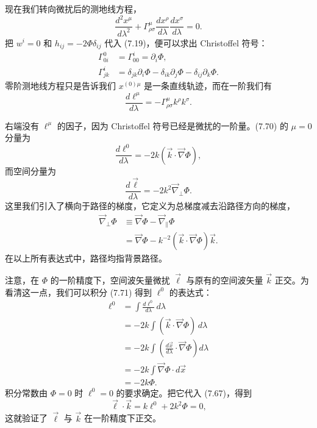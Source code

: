 现在我们转向微扰后的测地线方程，
\begin{equation*}
\frac{d^2x^\mu}{d\lambda^2} + \Gamma^\mu_{\rho\sigma}\frac{dx^\rho}{d\lambda}\frac{dx^\sigma}{d\lambda} = 0.
\tag{7.68}
\end{equation*}
把 $w^i = 0$ 和 $h_{ij} = -2\Phi\delta_{ij}$ 代入 (7.19)，便可以求出 Christoffel 符号：
\begin{align*}
\Gamma^0_{0i} &= \Gamma^i_{00} = \partial_i\Phi, \\
\Gamma^i_{jk} &= \delta_{jk}\partial_i\Phi - \delta_{ik}\partial_j\Phi - \delta_{ij}\partial_k\Phi.
\tag{7.69}
\end{align*}
零阶测地线方程只是告诉我们 $x^{(0)\mu}$ 是一条直线轨迹，而在一阶我们有
\begin{equation*}
\frac{d\ell^\mu}{d\lambda} = -\Gamma^\mu_{\rho\sigma}k^\rho k^\sigma.
\tag{7.70}
\end{equation*}


右端没有 $\ell^\mu$ 的因子，因为 Christoffel 符号已经是微扰的一阶量。(7.70) 的 $\mu = 0$ 分量为
\begin{equation*}
\frac{d\ell^0}{d\lambda} = -2k(\vec{k}\cdot\vec{\nabla}\Phi),
\tag{7.71}
\end{equation*}
而空间分量为
\begin{equation*}
\frac{d\vec{\ell}}{d\lambda} = -2k^2\vec{\nabla}_{\perp}\Phi.
\tag{7.72}
\end{equation*}
这里我们引入了横向于路径的梯度，它定义为总梯度减去沿路径方向的梯度，
\begin{align*}
\vec{\nabla}_{\perp}\Phi &\equiv \vec{\nabla}\Phi - \vec{\nabla}_{\parallel}\Phi \\
&= \vec{\nabla}\Phi - k^{-2}(\vec{k}\cdot\vec{\nabla}\Phi)\vec{k}.
\tag{7.73}
\end{align*}
在以上所有表达式中，路径均指背景路径。

注意，在 $\Phi$ 的一阶精度下，空间波矢量微扰 $\vec{\ell}$ 与原有的空间波矢量 $\vec{k}$ 正交。为看清这一点，我们可以积分 (7.71) 得到 $\ell^0$ 的表达式：
\begin{align*}
\ell^0 &= \int \frac{d\ell^0}{d\lambda}\, d\lambda \\
&= -2k\int (\vec{k}\cdot\vec{\nabla}\Phi)\, d\lambda \\
&= -2k\int \left(\frac{d\vec{x}}{d\lambda}\cdot\vec{\nabla}\Phi\right) d\lambda \\
&= -2k\int \vec{\nabla}\Phi\cdot d\vec{x} \\
&= -2k\Phi.
\tag{7.74}
\end{align*}
积分常数由 $\Phi = 0$ 时 $\ell^0 = 0$ 的要求确定。把它代入 (7.67)，得到
\begin{equation*}
\vec{\ell}\cdot\vec{k} = k\ell^0 + 2k^2\Phi = 0,
\tag{7.75}
\end{equation*}
这就验证了 $\vec{\ell}$ 与 $\vec{k}$ 在一阶精度下正交。

